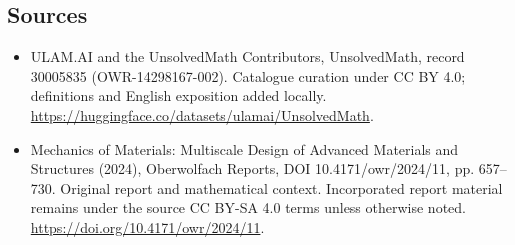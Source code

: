 \documentclass[11pt]{article}
\begin{document}
\subsection{Sources}
\begin{itemize}
\item[\hypertarget{source:30005835:1}{S1}] ULAM.AI and the UnsolvedMath Contributors, UnsolvedMath, record 30005835 (OWR-14298167-002). Catalogue curation under CC BY 4.0; definitions and English exposition added locally.
\url{https://huggingface.co/datasets/ulamai/UnsolvedMath}.
\item[\hypertarget{source:30005835:2}{S2}] Mechanics of Materials: Multiscale Design of Advanced Materials and Structures (2024), Oberwolfach Reports, DOI 10.4171/owr/2024/11, pp. 657--730. Original report and mathematical context. Incorporated report material remains under the source CC BY-SA 4.0 terms unless otherwise noted.
\url{https://doi.org/10.4171/owr/2024/11}.
\end{itemize}
\label{end:30005835}
\end{document}
